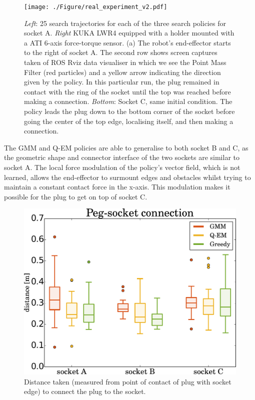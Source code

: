 \documentclass[final,3p,times,twocolumn]{elsarticle}
\begin{document}
\begin{figure}
 \centering
 \texttt{[image: ./Figure/real\_experiment\_v2.pdf]}
 \caption{\textit{Left}: 25 search trajectories for each of the three search policies for socket A. \textit{Right} KUKA LWR4 equipped with a holder mounted with a ATI 6-axis force-torque sensor. (a) The robot's end-effector starts to the 
 right of socket A. The second row shows screen captures taken of ROS Rviz data visualiser in which we see the Point Mass Filter 
 (red particles) and a yellow arrow indicating the direction given by the policy. In this particular run, the plug remained in contact with the ring of the socket until 
 the top was reached before making a connection. \textit{Bottom}: Socket C, same initial condition. The policy leads the plug down to 
 the bottom corner of the socket before going the center of the top edge, localising itself, and then making a connection.}
 \label{fig:real_pictures}
\end{figure}


The GMM and Q-EM policies are able to generalise to both socket B and C, as the geometric shape and connector interface of the 
two sockets are similar to socket A. The local force modulation of the policy's vector field, which is not learned, allows the 
end-effector to surmount edges and obstacles whilst trying to maintain a constant contact force in the x-axis. This modulation makes it possible 
for the plug to get on top of socket C.

\begin{figure}
 \centering
  \includegraphics[width=0.9\linewidth]{./Figures/Results2/peg_socket_connection_v2.pdf}
  \caption{Distance taken (measured from point of contact of plug with socket edge) to connect the plug to the socket.}
  \label{fig:real_statistics2}
\end{figure}
\end{document}
